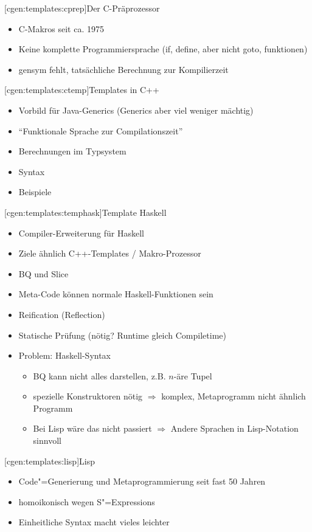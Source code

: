 \documentclass[a4paper, bibgerm]{book}
\newcommand\lsubsection{}
\newcommand{\sexps}{S"=Expressions}
\newcommand{\cgen}{Code"=Generierung}
\begin{document}
\lsubsection[cgen:templates:cprep]{Der C-Präprozessor}
\begin{itemize}
\item C-Makros seit ca. 1975
\item Keine komplette Programmiersprache (if, define, aber nicht goto, funktionen)
\item gensym fehlt, tatsächliche Berechnung zur Kompilierzeit
\end{itemize}

\lsubsection[cgen:templates:ctemp]{Templates in C++}

\begin{itemize}
\item Vorbild für Java-Generics (Generics aber viel weniger mächtig)
\item "`Funktionale Sprache zur Compilationszeit"'
\item Berechnungen im Typsystem
\item Syntax
\item Beispiele
\end{itemize}

\lsubsection[cgen:templates:temphask]{Template Haskell}

\begin{itemize}
\item Compiler-Erweiterung für Haskell
\item Ziele ähnlich C++-Templates / Makro-Prozessor
\item BQ und Slice
\item Meta-Code können normale Haskell-Funktionen sein
\item Reification (Reflection)
\item Statische Prüfung (nötig? Runtime gleich Compiletime)
\item Problem: Haskell-Syntax
  \begin{itemize}
  \item BQ kann nicht alles darstellen, z.B. $n$-äre Tupel
  \item spezielle Konstruktoren nötig $\Rightarrow$ komplex, Metaprogramm
    nicht ähnlich Programm
  \item Bei Lisp wäre das nicht passiert $\Rightarrow$ Andere Sprachen
    in Lisp-Notation sinnvoll
  \end{itemize}
\end{itemize}

\lsubsection[cgen:templates:lisp]{Lisp}

\begin{itemize}
\item \cgen{} und Metaprogrammierung seit fast 50 Jahren
\item homoikonisch wegen \sexps{}
\item Einheitliche Syntax macht vieles leichter
\end{itemize}
\end{document}
